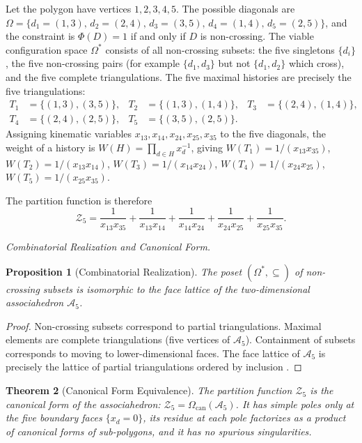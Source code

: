 \documentclass[11pt]{article}
\theoremstyle{plain}
\newtheorem{theorem}{Theorem}[section]
\newtheorem{proposition}[theorem]{Proposition}
\theoremstyle{definition}
\theoremstyle{remark}
\newcommand{\Phif}{\Phi}
\newcommand{\OmKS}{\Omega}
\begin{document}
Let the polygon have vertices $1, 2, 3, 4, 5$. The possible diagonals are $\OmKS = \{d_1 = (1,3),\, d_2 = (2,4),\, d_3 = (3,5),\, d_4 = (1,4),\, d_5 = (2,5)\}$, and the constraint is $\Phif(D) = 1$ if and only if $D$ is non-crossing. The viable configuration space $\OmKS^*$ consists of all non-crossing subsets: the five singletons $\{d_i\}$, the five non-crossing pairs (for example $\{d_1, d_3\}$ but not $\{d_1, d_2\}$ which cross), and the five complete triangulations. The five maximal histories are precisely the five triangulations:
\begin{align*}
  T_1 &= \{(1,3),(3,5)\}, & T_2 &= \{(1,3),(1,4)\}, & T_3 &= \{(2,4),(1,4)\},\\
  T_4 &= \{(2,4),(2,5)\}, & T_5 &= \{(3,5),(2,5)\}.
\end{align*}
Assigning kinematic variables $x_{13}, x_{14}, x_{24}, x_{25}, x_{35}$ to the five diagonals, the weight of a history is $W(H) = \prod_{d \in H} x_d^{-1}$, giving $W(T_1) = 1/(x_{13}x_{35})$, $W(T_2) = 1/(x_{13}x_{14})$, $W(T_3) = 1/(x_{14}x_{24})$, $W(T_4) = 1/(x_{24}x_{25})$, $W(T_5) = 1/(x_{25}x_{35})$.

The partition function is therefore
\begin{equation}
\label{eq:pentagon-Z}
  \mathcal{Z}_5 = \frac{1}{x_{13}x_{35}} + \frac{1}{x_{13}x_{14}} + \frac{1}{x_{14}x_{24}} + \frac{1}{x_{24}x_{25}} + \frac{1}{x_{25}x_{35}}.
\end{equation}

\medskip\noindent\textit{Combinatorial Realization and Canonical Form.}

\begin{proposition}[Combinatorial Realization]
The poset $(\OmKS^*, \subseteq)$ of non-crossing subsets is isomorphic to the face lattice of the two-dimensional associahedron $\mathcal{A}_5$.
\end{proposition}

\begin{proof}
Non-crossing subsets correspond to partial triangulations. Maximal elements are complete triangulations (five vertices of $\mathcal{A}_5$). Containment of subsets corresponds to moving to lower-dimensional faces. The face lattice of $\mathcal{A}_5$ is precisely the lattice of partial triangulations ordered by inclusion \cite{Stasheff1963}.
\end{proof}

\begin{theorem}[Canonical Form Equivalence]
The partition function $\mathcal{Z}_5$ is the canonical form of the associahedron: $\mathcal{Z}_5 = \Omega_{\mathrm{can}}(\mathcal{A}_5)$. It has simple poles only at the five boundary faces $\{x_d = 0\}$, its residue at each pole factorizes as a product of canonical forms of sub-polygons, and it has no spurious singularities.
\end{theorem}
\end{document}
